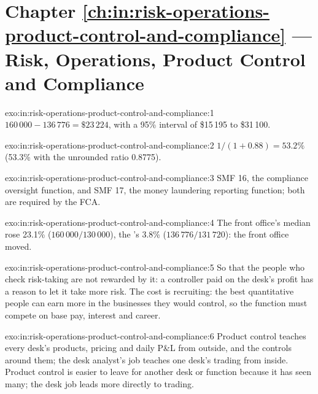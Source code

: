 \section*{Chapter \ref{ch:in:risk-operations-product-control-and-compliance} --- Risk, Operations, Product Control and Compliance}

\begin{solution}{exo:in:risk-operations-product-control-and-compliance:1}
$160\,000-136\,776=\$23\,224$, with a 95\% interval of \$15\,195 to \$31\,100.
\end{solution}

\begin{solution}{exo:in:risk-operations-product-control-and-compliance:2}
$1/(1+0.88)=53.2\%$ (53.3\% with the unrounded ratio 0.8775).
\end{solution}

\begin{solution}{exo:in:risk-operations-product-control-and-compliance:3}
SMF 16, the compliance oversight function, and SMF 17, the money laundering reporting function; both are required by the
FCA.
\end{solution}

\begin{solution}{exo:in:risk-operations-product-control-and-compliance:4}
The front office's median rose 23.1\% ($160\,000/130\,000$), the 's 3.8\% ($136\,776/131\,720$): the
front office moved.
\end{solution}

\begin{solution}{exo:in:risk-operations-product-control-and-compliance:5}
So that the people who check risk-taking are not rewarded by it: a controller paid on the desk's profit has a reason to
let it take more risk. The cost is recruiting: the best quantitative people can earn more in the businesses they would
control, so the function must compete on base pay, interest and career.
\end{solution}

\begin{solution}{exo:in:risk-operations-product-control-and-compliance:6}
Product control teaches every desk's products, pricing and daily P\&L from outside, and the controls around them; the
desk analyst's job teaches one desk's trading from inside. Product control is easier to leave for another desk or
function because it has seen many; the desk job leads more directly to trading.
\end{solution}

